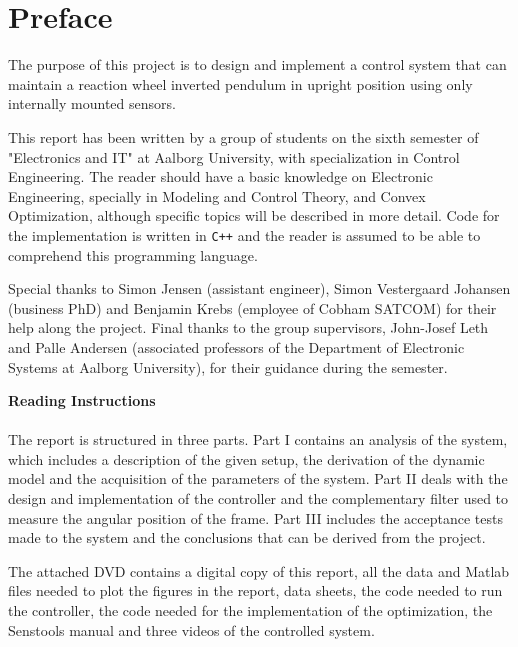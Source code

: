 
\chapter*{Preface}
\vspace{-12pt}The purpose of this project is to design and implement a control system that can maintain a reaction wheel inverted pendulum in upright position using only internally mounted sensors.

This report has been written by a group of students on the sixth semester of "Electronics and IT" at Aalborg University, with specialization in Control Engineering.
The reader should have a basic knowledge on Electronic Engineering, specially in Modeling and Control Theory, and Convex Optimization, although specific topics will be described in more detail. Code for the implementation is written in \texttt{C++} and the reader is assumed to be able to comprehend this programming language. 

Special thanks to Simon Jensen (assistant engineer), Simon Vestergaard Johansen (business PhD) and Benjamin Krebs (employee of Cobham SATCOM) for their help along the project. Final thanks to the group supervisors, John-Josef Leth and Palle Andersen (associated professors of the Department of Electronic Systems at Aalborg University), for their guidance during the semester.

\textbf{Reading Instructions}\\
\vspace{-6pt}\\
\noindent The report is structured in three parts. Part I contains an analysis of the system, which includes a description of the given setup, the derivation of the dynamic model and the acquisition of the parameters of the system. Part II deals with the design and implementation of the controller and the complementary filter used to measure the angular position of the frame. Part III includes the acceptance tests made to the system and the conclusions that can be derived from the project.

The attached DVD contains a digital copy of this report, all the data and Matlab files needed to plot the figures in the report, data sheets, the code needed to run the controller, the code needed for the implementation of the optimization, the Senstools manual and three videos of the controlled system.  

